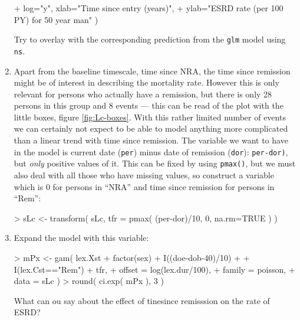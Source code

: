 \begin{enumerate}[resume]
\begin{Schunk}
\begin{Sinput}
+          log="y", xlab="Time since entry (years)",
+                   ylab="ESRD rate (per 100 PY) for 50 year man" )
\end{Sinput}
\end{Schunk}
Try to overlay with the corresponding prediction from the
\texttt{glm} model using \texttt{ns}. 
\item Apart from the baseline timescale, time since NRA, the time
  since remission might be of interest in describing the mortality
  rate.  However this is only relevant for persons who actually have a
  remission, but there is only 28 persons in this group and 8 events
  --- this can be read of the plot with the little boxes, figure
  \ref{fig:Lc-boxes}.
  With this rather limited number of events we can certainly not
  expect to be able to model anything more complicated than a linear
  trend with time since remission.
  The variable we want to have in the model is current date
  (\texttt{per}) minus date of remission (\texttt{dor}):
  \texttt{per-dor)}, but \emph{only} positive values of it. This
  can be fixed by using \texttt{pmax()}, but we must also deal with
  all those who have missing values, so construct a variable which is
  0 for persons in ``NRA'' and time since remission for persons in ``Rem'':
\begin{Schunk}
\begin{Sinput}
> sLc <- transform( sLc, tfr = pmax( (per-dor)/10, 0, na.rm=TRUE ) )
\end{Sinput}
\end{Schunk}
\item Expand the model with this variable:
\begin{Schunk}
\begin{Sinput}
> mPx <- gam( lex.Xst %in% EP ~ s( tfi, k=10 ) +
+                    factor(sex) + I((doe-dob-40)/10) +  
+                    I(lex.Cst=="Rem") + tfr,
+             offset = log(lex.dur/100),
+             family = poisson, 
+               data = sLc )
> round( ci.exp( mPx ), 3 )
\end{Sinput}
\end{Schunk}
What can ou say about the effect of tinesince remisssion on the rate
of ESRD?
\end{enumerate}
